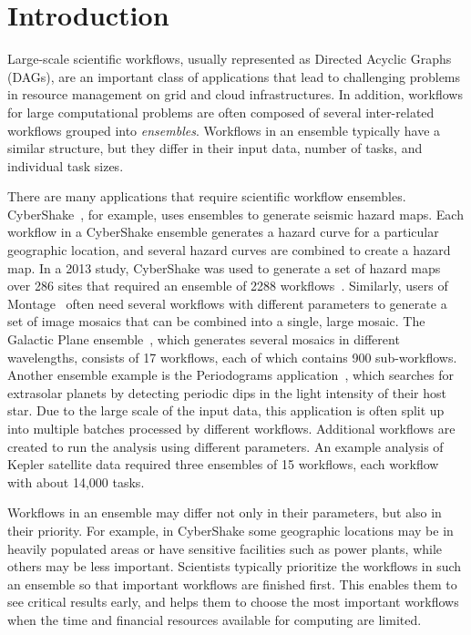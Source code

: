 \documentclass[preprint,5p]{elsarticle}
\begin{document}
\section{Introduction}
\label{sec:intro}

Large-scale scientific workflows, usually represented as Directed Acyclic Graphs
(DAGs), are an important class of applications that lead to challenging problems
in resource management on grid and cloud infrastructures. In addition, workflows
for large computational problems are often composed of several inter-related
workflows grouped into {\em ensembles}. Workflows in an ensemble typically have
a similar structure, but they differ in their input data, number of tasks, and
individual task sizes.

There are many applications that require scientific workflow ensembles.
CyberShake~\cite{Callaghan2011}, for example, uses ensembles to generate seismic
hazard maps.  Each workflow in a CyberShake ensemble generates a hazard curve
for a particular geographic location, and several hazard curves are combined to
create a hazard map.  In a 2013 study, CyberShake was used to generate a set
of hazard maps over 286 sites that required an ensemble of 2288
workflows~\cite{CyberShake13.4}. Similarly, users of Montage~\cite{Deelman2008}
often need several workflows  with different parameters to generate a set of
image mosaics that can be combined  into a single, large mosaic. The Galactic
Plane ensemble~\cite{GalacticPlane}, which generates several mosaics 
in different wavelengths, consists of 17 workflows,
each of which contains 900 sub-workflows.  Another ensemble example is the
Periodograms application~\cite{Vockler2011}, which searches for extrasolar
planets by detecting periodic dips in the light intensity of their host star.
Due to the large scale of the input data, this application is often split up
into multiple batches processed by different workflows. Additional workflows are
created to run the analysis using different parameters. 
An example analysis of Kepler satellite data required three ensembles of 15 workflows, 
each workflow with about 14,000 tasks.

Workflows in an ensemble may differ not only in their parameters, but also in
their priority. For example, in CyberShake some geographic locations may be in heavily
populated areas or have sensitive facilities such as power plants, while others
may be less important. Scientists typically prioritize the workflows in such
an ensemble so that important workflows are finished first. This enables them
to see critical results early, and helps them to choose the most important
workflows when the time and financial resources available for computing are
limited.
\end{document}
